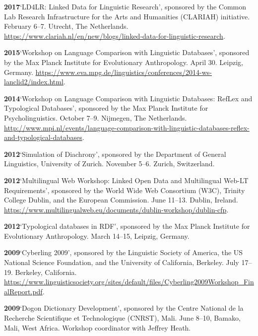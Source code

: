 \documentclass[11pt]{article}
\newcommand{\hangpara}{
 \setlength{\parindent}{0in} %
 \hangindent=0.42in %
}
\begin{document}
\hangpara
\vskip 6pt
{\bf 2017}\hspace{1ex}`LD4LR: Linked Data for Linguistic Research', sponsored by the Common Lab Research Infrastructure for the Arts and Humanities (CLARIAH) initiative. February 6--7. Utrecht, The Netherlands. \url{https://www.clariah.nl/en/new/blogs/linked-data-for-linguistic-research}.

\hangpara
\vskip 6pt
{\bf 2015}\hspace{1ex}`Workshop on Language Comparison with Linguistic Databases', sponsored by the Max Planck Institute for Evolutionary Anthropology. April 30. Leipzig, Germany. \url{https://www.eva.mpg.de/linguistics/conferences/2014-ws-lanclid2/index.html}.

\hangpara
\vskip 6pt
{\bf 2014}\hspace{1ex}`Workshop on Language Comparison with Linguistic Databases: RefLex and Typological Databases', sponsored by the Max Planck Institute for Psycholinguistics. October 7--9. Nijmegen, The Netherlands. \url{http://www.mpi.nl/events/language-comparison-with-linguistic-databases-reflex-and-typological-databases}.

\vskip 6pt
\hangpara
{\bf 2012}\hspace{1ex}`Simulation of Diachrony', sponsored by the Department of General Linguistics, University of Zurich. November 5--6. Zurich, Switzerland.

\vskip 6pt
\hangpara
{\bf 2012}\hspace{1ex}`Multilingual Web Workshop: Linked Open Data and Multilingual Web-LT Requirements', sponsored by the World Wide Web Consortium (W3C), Trinity College Dublin, and the European Commission. June 11--13. Dublin, Ireland. \url{https://www.multilingualweb.eu/documents/dublin-workshop/dublin-cfp}.

\vskip 6pt
\hangpara
{\bf 2012}\hspace{1ex}`Typological databases in RDF', sponsored by the Max Planck Institute for Evolutionary Anthropology. March 14--15, Leipzig, Germany. 

\vskip 6pt
\hangpara
{\bf 2009}\hspace{1ex}`Cyberling 2009', sponsored by the Linguistic Society of America, the US National Science Foundation, and the University of California, Berkeley. July 17--19. Berkeley, California. \small\url{https://www.linguisticsociety.org/sites/default/files/Cyberling2009Workshop_FinalReport.pdf}.

\vskip 6pt
\hangpara
{\bf 2009}\hspace{1ex}`Dogon Dictionary Development', sponsored by the Centre National de la Recherche Scientifique et Technologique (CNRST), Mali. June 8--10, Bamako, Mali, West Africa. Workshop coordinator with Jeffrey Heath.
\end{document}
